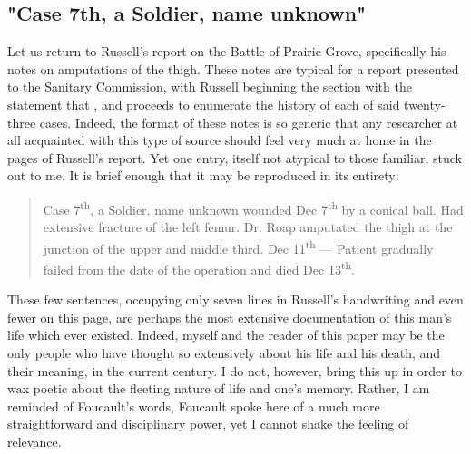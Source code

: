 \documentclass[12pt]{article}
\begin{document}
\subsection{"Case 7th, a Soldier, name unknown"} Let us return to Russell's report on the Battle of Prairie Grove, specifically his notes on amputations of the
thigh.\autocite[21]{ussc:2:194} These notes are typical for a report presented to the Sanitary Commission, with Russell beginning the section with the statement
that , and proceeds to enumerate the history of each of said twenty-three cases.\autocite[21]{ussc:2:194}
Indeed, the format of these notes is so generic that any researcher at all acquainted with this type of source should feel very much at home in the pages
of Russell's report. Yet one entry, itself not atypical to those familiar, stuck out to me. It is brief enough that it may be reproduced in its entirety:

\begin{quote}
	Case 7\textsuperscript{th}, a Soldier, name unknown wounded Dec 7\textsuperscript{th} by a conical ball. Had extensive fracture of the left femur. Dr. Roap
	amputated the thigh at the junction of the upper and middle third. Dec 11\textsuperscript{th} --- Patient gradually failed from the date of the operation and died
	Dec 13\textsuperscript{th}.\autocite[25]{ussc:2:194}
\end{quote}

These few sentences, occupying only seven lines in Russell's handwriting and even fewer on this page, are perhaps the most extensive documentation of this man's
life which ever existed. Indeed, myself and the reader of this paper may be the only people who have thought so extensively about his life and his death, and their
meaning, in the current century. I do not, however, bring this up in order to wax poetic about the fleeting nature of life and one's memory. Rather, I am reminded
of Foucault's words, \autocite[161]{foucault2019} Foucault spoke here of a much more
straightforward and disciplinary power, yet I cannot shake the feeling of relevance.
\end{document}
